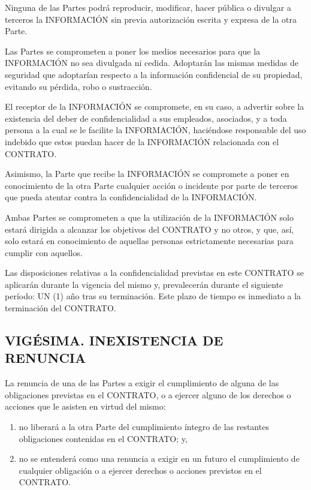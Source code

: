 \documentclass[a4paper,11pt]{report}
\begin{document}
	Ninguna de las Partes podrá reproducir, modificar, hacer pública o
	divulgar a terceros la INFORMACIÓN sin previa autorización escrita y
	expresa de la otra Parte.

	Las Partes se comprometen a poner los medios necesarios para que la
	INFORMACIÓN no sea divulgada ni cedida. Adoptarán las mismas medidas de
	seguridad que adoptarían respecto a la información confidencial de su
	propiedad, evitando su pérdida, robo o sustracción.

	El receptor de la INFORMACIÓN se compromete, en su caso, a advertir
	sobre la existencia del deber de confidencialidad a sus empleados,
	asociados, y a toda persona a la cual se le facilite la INFORMACIÓN,
	haciéndose responsable del uso indebido que estos puedan hacer de la
	INFORMACIÓN relacionada con el CONTRATO.

	Asimismo, la Parte que recibe la INFORMACIÓN se compromete a poner en
	conocimiento de la otra Parte cualquier acción o incidente por parte de
	terceros que pueda atentar contra la confidencialidad de la INFORMACIÓN.

	Ambas Partes se comprometen a que la utilización de la INFORMACIÓN solo
	estará dirigida a alcanzar los objetivos del CONTRATO y no otros, y que,
	así, solo estará en conocimiento de aquellas personas estrictamente
	necesarias para cumplir con aquellos.

	Las disposiciones relativas a la confidencialidad previstas en este
	CONTRATO se aplicarán durante la vigencia del mismo y, prevalecerán
	durante el siguiente período: UN (1) año tras su terminación.
	Este plazo de tiempo es inmediato a la terminación del CONTRATO.

	\subsection*{VIGÉSIMA. INEXISTENCIA DE RENUNCIA}

	La renuncia de una de las Partes a exigir el cumplimiento de alguna de
	las obligaciones previstas en el CONTRATO, o a ejercer alguno de los
	derechos o acciones que le asisten en virtud del mismo:
		\begin{enumerate}[label=\Alph*)]
			\item no liberará a la otra Parte del cumplimiento íntegro de las
			restantes obligaciones contenidas en el CONTRATO; y,

			\item no se entenderá como una renuncia a
			exigir en un futuro el cumplimiento de cualquier obligación o a ejercer
			derechos o acciones previstos en el CONTRATO.
		\end{enumerate}
\end{document}
